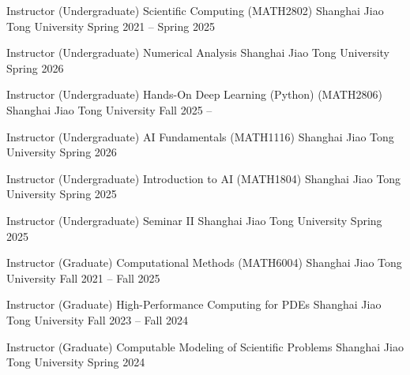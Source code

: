 
\begin{cventries}

  \cventry
  {Instructor (Undergraduate)}
  {Scientific Computing (MATH2802)}
  {Shanghai Jiao Tong University}
  {Spring 2021 -- Spring 2025}
  {}

  \cventry
  {Instructor (Undergraduate)}
  {Numerical Analysis}
  {Shanghai Jiao Tong University}
  {Spring 2026}
  {}

  \cventry
  {Instructor (Undergraduate)}
  {Hands-On Deep Learning (Python) (MATH2806)}
  {Shanghai Jiao Tong University}
  {Fall 2025 -- }
  {}

  \cventry
  {Instructor (Undergraduate)}
  {AI Fundamentals (MATH1116)}
  {Shanghai Jiao Tong University}
  {Spring 2026}
  {}

  \cventry
  {Instructor (Undergraduate)}
  {Introduction to AI (MATH1804)}
  {Shanghai Jiao Tong University}
  {Spring 2025}
  {}

  \cventry
  {Instructor (Undergraduate)}
  {Seminar II}
  {Shanghai Jiao Tong University}
  {Spring 2025}
  {}

  \cventry
  {Instructor (Graduate)}
  {Computational Methods (MATH6004)}
  {Shanghai Jiao Tong University}
  {Fall 2021 -- Fall 2025}
  {}

  \cventry
  {Instructor (Graduate)}
  {High-Performance Computing for PDEs}
  {Shanghai Jiao Tong University}
  {Fall 2023 -- Fall 2024}
  {}

  \cventry
  {Instructor (Graduate)}
  {Computable Modeling of Scientific Problems}
  {Shanghai Jiao Tong University}
  {Spring 2024}
  {}


\end{cventries}
